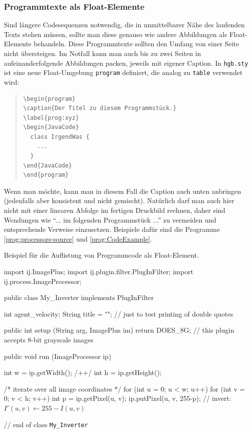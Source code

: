 \subsubsection{Programmtexte als Float-Elemente}
Sind längere Codesequenzen notwendig, die in unmittelbarer Nähe des laufenden Texts
stehen müssen, sollte man diese genauso wie andere Abbildungen als Float-Elemente
behandeln. Diese Programmtexte sollten den Umfang von einer Seite nicht übersteigen.
Im Notfall kann man auch bis zu zwei Seiten in aufeinanderfolgende Abbildungen packen,
jeweils mit eigener Caption. In \texttt{hgb.sty} ist eine neue Float-Umgebung \texttt{program} definiert, die analog zu \texttt{table} verwendet wird:
%
\begin{quote}
\begin{verbatim}
\begin{program}
\caption{Der Titel zu diesem Programmstück.}
\label{prog:xyz}
\begin{JavaCode}
  class IrgendWas {
    ...
  }
\end{JavaCode}
\end{program}
\end{verbatim}
\end{quote}
%
Wenn man möchte, kann man in diesem Fall die Caption auch unten anbringen 
(jedenfalls aber konsistent und nicht gemischt).
Natürlich darf man auch hier  nicht mit einer linearen  Abfolge im fertigen
Druckbild rechnen, daher sind Wendungen wie
"`... im  folgenden Programmstück ..."' zu vermeiden und entsprechende Verweise
einzusetzen. Beispiele dafür sind die Programme \ref{prog:processors-source} und \ref{prog:CodeExample}.

\begin{program}
\caption{Beispiel für die Auflistung von Programmcode als Float-Element.}
\label{prog:CodeExample}
\begin{JavaCode}
import ij.ImagePlus;
import ij.plugin.filter.PlugInFilter;
import ij.process.ImageProcessor;

public class My_Inverter implements PlugInFilter {
	int agent_velocity;
  String title = ""; // just to test printing of double quotes

	public int setup (String arg, ImagePlus im) {
		return DOES_8G;	// this plugin accepts 8-bit grayscale images \label{pr:IjSamplePlugin10}
	}

	public void run (ImageProcessor ip) {
		int w = ip.getWidth();	/+\label{ExampleCodeLabel}+/
		int h = ip.getHeight(); 
		
		/* iterate over all image coordinates */
		for (int u = 0; u < w; u++) { 
			for (int v = 0; v < h; v++) {
				int p = ip.getPixel(u, v); 
				ip.putPixel(u, v, 255-p); // invert: $I'(u,v) \leftarrow 255 - I(u,v)$\label{MathInCode}
			}
		}
	}
			
} // end of class {\tt My\_Inverter}
\end{JavaCode}
%
\end{program}


